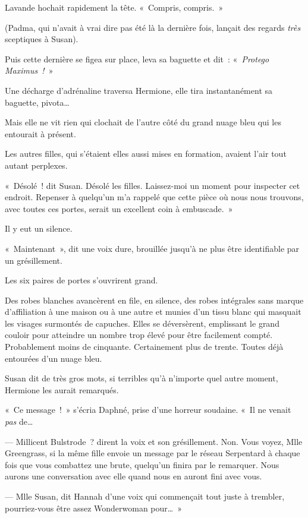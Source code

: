 Lavande hochait rapidement la tête. «~Compris, compris.~»

(Padma, qui n'avait à vrai dire pas été là la dernière fois, lançait des regards \emph{très} sceptiques à Susan).

Puis cette dernière se figea sur place, leva sa baguette et dit~: «~\emph{Protego Maximus~!}~»

Une décharge d'adrénaline traversa Hermione, elle tira instantanément sa baguette, pivota…

Mais elle ne vit rien qui clochait de l'autre côté du grand nuage bleu qui les entourait à présent.

Les autres filles, qui s'étaient elles aussi mises en formation, avaient l'air tout autant perplexes.

«~Désolé~! dit Susan. Désolé les filles. Laissez-moi un moment pour inspecter cet endroit. Repenser à quelqu'un m'a rappelé que cette pièce où nous nous trouvons, avec toutes ces portes, serait un excellent coin à embuscade.~»

Il y eut un silence.

«~Maintenant~», dit une voix dure, brouillée jusqu'à ne plus être identifiable par un grésillement.

Les six paires de portes s'ouvrirent grand.

Des robes blanches avancèrent en file, en silence, des robes intégrales sans marque d'affiliation à une maison ou à une autre et munies d'un tissu blanc qui masquait les visages surmontés de capuches. Elles se déversèrent, emplissant le grand couloir pour atteindre un nombre trop élevé pour être facilement compté. Probablement moins de cinquante. Certainement plus de trente. Toutes déjà entourées d'un nuage bleu.

Susan dit de très gros mots, si terribles qu'à n'importe quel autre moment, Hermione les aurait remarqués.

«~Ce message~!~» s'écria Daphné, prise d'une horreur soudaine. «~Il ne venait \emph{pas} de…

--- Millicent Bulstrode~? dirent la voix et son grésillement. Non. Vous voyez, Mlle Greengrass, si la même fille envoie un message par le réseau Serpentard à chaque fois que vous combattez une brute, quelqu'un finira par le remarquer. Nous aurons une conversation avec elle quand nous en auront fini avec vous.

--- Mlle Susan, dit Hannah d'une voix qui commençait tout juste à trembler, pourriez-vous être assez Wonderwoman pour…~»

